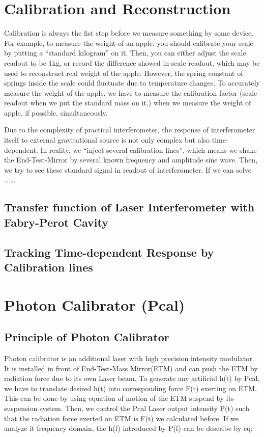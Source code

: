 \section{Calibration and Reconstruction}

Calibration is always the fist step before we measure something by some device.
For example, to measure the weight of an apple, you should calibrate your scale by putting a “standard kilogram” on it. Then, you can either adjust the scale readout to be 1kg, or record the difference showed in scale readout, which may be used to reconstruct real weight of the apple. However, the spring constant of springs inside the scale could fluctuate due to temperature changes. To accurately measure the weight of the apple, we have to measure the calibration factor (scale readout when we put the standard mass on it.) when we measure the weight of apple, if possible, simultaneously.

Due to the complexity of practical interferometer, the response of interferometer itself to external gravitational source is not only complex but also time-dependent. In reality, we “inject several calibration lines”, which means we shake the End-Test-Mirror by several known frequency and amplitude sine wave. Then, we try to see these standard signal in readout of interferometer. If we can solve 
……. 


\subsection{Transfer function of Laser Interferometer with Fabry-Perot Cavity}
\subsection{Tracking Time-dependent Response by Calibration lines}



\section{Photon Calibrator (Pcal)}
\subsection{Principle of Photon Calibrator}
Photon calibrator is an additional laser with high precision intensity modulator. It is installed in front of End-Test-Mass Mirror(ETM) and can push the ETM by radiation force due to its own Laser beam. To generate any artificial h(t) by Pcal, we have to translate desired h(t) into corresponding force F(t) exerting on ETM. This can be done by using equation of motion of the ETM suspend by its suspension system. Then, we control the Pcal Laser output intensity P(t) such that the radiation force exerted on ETM is F(t) we calculated before. If we analyze it frequency domain,  the h(f) introduced by P(f) can be describe by eq:

